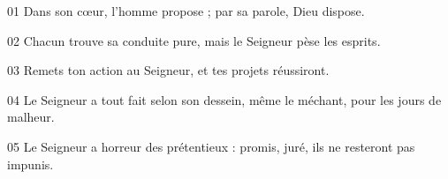 01 Dans son cœur, l’homme propose ; par sa parole, Dieu dispose.

02 Chacun trouve sa conduite pure, mais le Seigneur pèse les esprits.

03 Remets ton action au Seigneur, et tes projets réussiront.

04 Le Seigneur a tout fait selon son dessein, même le méchant, pour les jours de malheur.

05 Le Seigneur a horreur des prétentieux : promis, juré, ils ne resteront pas impunis.
